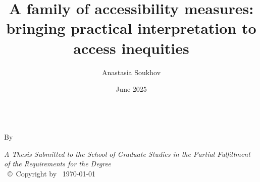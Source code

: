 \documentclass[
11pt, %
oneside, %
english, %
singlespacing, %
]{macthesis} %
\title{A family of accessibility measures: bringing practical interpretation to access inequities}
\author{Anastasia Soukhov}
\date{June 2025}
\def\blankpage{%
      \clearpage%
      \thispagestyle{empty}%
      \addtocounter{page}{-1}%
      \null%
      \clearpage}
\begin{document}
\sloppy

\frontmatter %

\pagestyle{plain} %

\vspace{6cm}
\begin{center}
\ttitle
\end{center}
\clearpage

\begin{center}

\vfill
\textsc{\Large \ttitle} \\

\vfill
{By \authorname\, \bdeg \, \mdeg }


 \vfill
{\large \textit{A Thesis Submitted to the School of Graduate Studies in the Partial Fulfillment of the Requirements for the Degree \degreename}}\\

\vfill
{\large \univname\, \copyright\, Copyright by \authorname\, \today}\\[4cm] %

\end{center}
\blankpage
\clearpage


\vspace*{0.2\textheight}

\bigbreak
\end{document}
